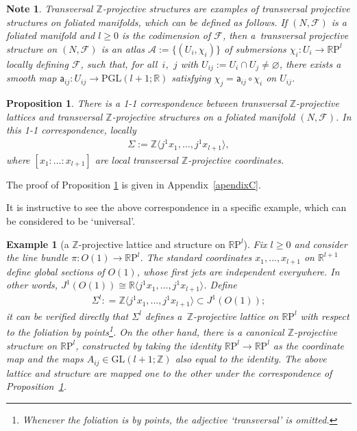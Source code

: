 \documentclass[pdftex]{sigma}
\numberwithin{equation}{section}
\newtheorem{Proposition}[Theorem]{Proposition}
\newtheorem{Note}[Theorem]{Note}
\newtheorem{Example}[Theorem]{Example}
\newcommand{\RR}{\mathbb{R}}
\newcommand{\ZZ}{\mathbb{Z}}
\begin{document}
\begin{Note}\label{obs:trans_proj_structure}
Transversal $\ZZ$-projective structures are examples of {\it transversal projective structures} on foliated manifolds, which can be def\/ined as follows. If $(N,\mathcal{F})$ is a foliated manifold and $l \geq 0$ is the codimension of $\mathcal{F}$, then a~transversal projective structure on $(N,\mathcal{F})$ is an atlas $\mathcal{A} :=\{(U_i, \chi_i)\}$ of submersions $\chi_i \colon U_i \to \RR\mathrm{P}^l$ locally def\/ining $\mathcal{F}$, such that, for all~$i$,~$j$ with $U_{ij} := U_i \cap U_j \neq \varnothing$, there exists a smooth map $\mathsf{a}_{ij}\colon U_{ij} \to \mathrm{PGL}(l+1;\RR)$ satisfying $\chi_j = \mathsf{a}_{ij}\circ \chi_i$ on $U_{ij}$.
 \end{Note}

\begin{Proposition}\label{thm:tilp_tilpa}
 There is a {\rm 1-1} correspondence between transversal $\ZZ$-projective lattices and transversal $\ZZ$-projective structures on a foliated manifold $(N,\mathcal{F})$. In this {\rm 1-1} correspondence, locally
 \begin{gather*}
 \Sigma := \ZZ \big\langle j^1x_1,\ldots, j^1x_{l+1} \big\rangle,
 \end{gather*}
where $[x_1:\ldots:x_{l+1}]$ are local transversal $\ZZ$-projective
 coordinates.
\end{Proposition}

The proof of Proposition \ref{thm:tilp_tilpa} is given in Appendix~\ref{apendixC}.

It is instructive to see the above correspondence in a specif\/ic example, which can be considered to be `universal'.

\begin{Example}[a $\ZZ$-projective lattice and structure on $\mathbb{R}\mathrm{P}^l$]\label{ex:projective_plane}
Fix $l \geq 0$ and consider the line bundle $\pi\colon O(1) \to \RR \mathrm{P}^l$. The standard coordinates $x_1,\ldots,x_{l+1}$ on $\RR^{l+1}$ def\/ine global sections of $O(1)$, whose f\/irst jets are independent everywhere. In other words, $J^1(O(1)) \cong \RR \langle j^1x_1,\ldots,j^1x_{l+1} \rangle$. Def\/ine
\begin{gather*}
 \Sigma^{l} : = \ZZ \big\langle j^1x_1,\ldots,j^1x_{l+1} \big\rangle \subset J^1(O(1));
 \end{gather*}
it can be verif\/ied directly that $\Sigma^l$ def\/ines a~$\ZZ$-projective lattice on $\RR\mathrm{P}^l$ with respect to the foliation by points\footnote{Whenever the foliation is by points, the adjective `transversal' is omitted.}. On the other hand, there is a canonical $\ZZ$-projective structure on $\RR\mathrm{P}^l$, constructed by taking the identity $\RR\mathrm{P}^l \to \RR \mathrm{P}^l$ as the coordinate map and the maps $A_{ij} \in \mathrm{GL}(l+1;\ZZ)$ also equal to the identity. The above lattice and structure are mapped one to the other under the correspondence of Proposition~\ref{thm:tilp_tilpa}.
\end{Example}
\end{document}
